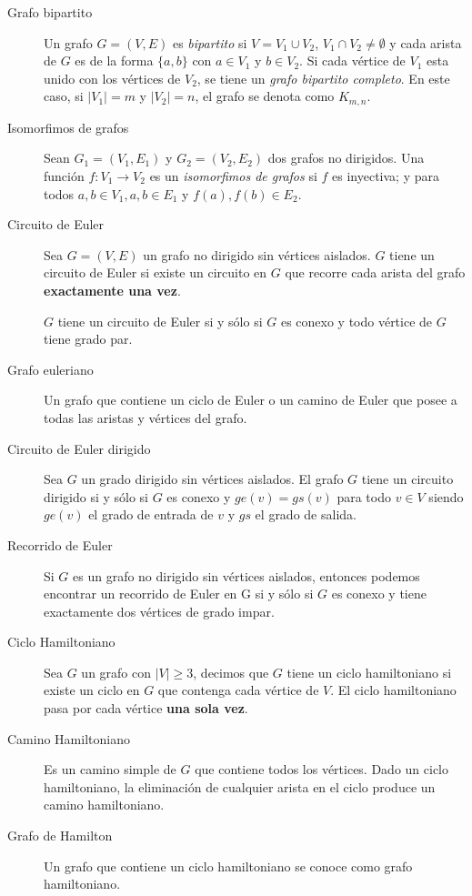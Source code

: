 \documentclass[a4paper, twoside]{article}
\begin{document}
\begin{description}
	\item[Grafo bipartito] Un grafo $G = (V,E)$ es \emph{bipartito} si $V = V_1 \cup V_2$, $V_1 \cap V_2 \neq \emptyset$ y cada arista de $G$ es de la forma $\{ a, b \}$ con $a \in V_1$ y $b \in V_2$. Si cada vértice de $V_1$ esta unido con los vértices de $V_2$, se tiene un \emph{grafo bipartito completo}.
	En este caso, si $|V_1| = m$ y $|V_2| = n$, el grafo se denota como $K_{m,n}$.

	\item[Isomorfimos de grafos] Sean $G_1 = (V_1, E_1)$ y $G_2 = (V_2, E_2)$ dos grafos no dirigidos.
	Una función $f:V_1 \rightarrow V_2$ es un \emph{isomorfimos de grafos} si $f$ es inyectiva; y para todos $a,b \in V_1, {a,b} \in E_1$ y ${f(a),f(b)} \in E_2$.

	\item[Circuito de Euler] Sea $G = (V,E)$ un grafo no dirigido sin vértices aislados.
	$G$ tiene un circuito de Euler si existe un circuito en $G$ que recorre cada arista del grafo \textbf{exactamente una vez}.
	
	$G$ tiene un circuito de Euler si y sólo si $G$ es conexo y todo vértice de $G$ tiene grado par.

	\item[Grafo euleriano] Un grafo que contiene un ciclo de Euler o un camino de Euler que posee a todas las aristas y vértices del grafo.

	\item[Circuito de Euler dirigido] Sea $G$ un grado dirigido sin vértices aislados.
	El grafo $G$ tiene un circuito dirigido si y sólo si $G$ es conexo y $ge(v) = gs(v)$ para todo $v \in V$ siendo $ge(v)$ el grado de entrada de $v$ y $gs$ el grado de salida. 

	\item[Recorrido de Euler] Si $G$ es un grafo no dirigido sin vértices aislados, entonces podemos encontrar un recorrido de Euler en G si y sólo si $G$ es conexo y tiene exactamente dos vértices de grado impar.

	\item[Ciclo Hamiltoniano] Sea $G$ un grafo con $|V| \ge 3$, decimos que $G$ tiene un ciclo hamiltoniano si existe un ciclo en $G$ que contenga cada vértice de $V$.
	El ciclo hamiltoniano pasa por cada vértice \textbf{una sola vez}.

	\item[Camino Hamiltoniano] Es un camino simple de $G$ que contiene todos los vértices.
	Dado un ciclo hamiltoniano, la eliminación de cualquier arista en el ciclo produce un
	camino hamiltoniano.

	\item[Grafo de Hamilton] Un grafo que contiene un ciclo hamiltoniano se conoce como grafo hamiltoniano.
\end{description}
\end{document}
